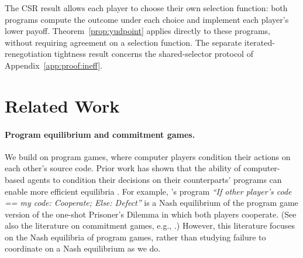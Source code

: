 \documentclass[sigconf]{aamas}
\theoremstyle{definition}
\begin{document}
The CSR result allows each player to choose their own selection function:
both programs compute the outcome under each choice and implement each
player's lower payoff. Theorem~\ref{prop:yudpoint} applies directly to
these programs, without requiring agreement on a selection function.
The separate iterated-renegotiation tightness result concerns the
shared-selector protocol of Appendix~\ref{app:proof:ineff}.

\section{Related Work} 
\paragraph{Program equilibrium and commitment games.}
We 
build on  
program games,  
where computer players condition their actions
on each other's source code. 
Prior work has shown that the ability of computer-based
agents to condition their decisions on their
counterparts' programs can
enable
more efficient equilibria
\citep{mcafee,Howard1988May,rubinstein,tennenholtz2004program,lavictoire2014program,critch2019parametric,oesterheld2019robust,DiGiovanni2022Apr}. For example, 
\citet{mcafee}'s
program
\textit{``If other player's code == my code: Cooperate; Else: Defect''}
is a Nash equilibrium of the program game version of the
one-shot Prisoner's Dilemma in which both players cooperate. 
(See also the literature
on commitment games, e.g.,
\citet{kalai2010commitment,FORGES201364}.) 
However, this literature focuses on 
the Nash equilibria of program games, 
rather than studying failure to coordinate
on a Nash equilibrium as we do.
\end{document}

